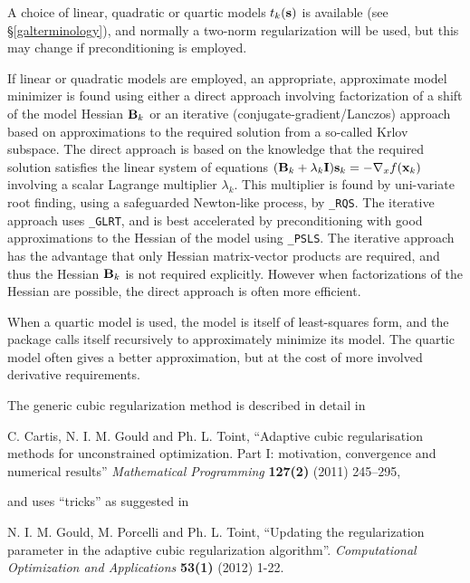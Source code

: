 \documentclass{galahad}
\begin{document}
A choice of linear, quadratic or quartic models $t_k({\mathbf{s}})$ is available
(see \S\ref{galterminology}), and normally a two-norm regularization will
be used, but this may change if preconditioning is employed.

If linear or quadratic models are employed, an appropriate,
approximate model minimizer is found using either a direct approach
involving factorization of a shift of the model Hessian ${\mathbf{B}}_k$ or an
iterative (conjugate-gradient/Lanczos) approach based on approximations
to the required solution from a so-called Krlov subspace. The direct
approach is based on the knowledge that the required solution
satisfies the linear system of equations $({\mathbf{B}}_k + \lambda_k {\mathbf{I}}) {\mathbf{s}}_k
= - \nabla_x f({\mathbf{x}}_k)$ involving a scalar Lagrange multiplier $\lambda_k$.
This multiplier is found by uni-variate root finding, using a safeguarded
Newton-like process, by {\tt \libraryname\_RQS}. The iterative approach
uses {\tt \libraryname\_GLRT}, and is best accelerated by preconditioning
with good approximations to the Hessian of the model using
{\tt \libraryname\_PSLS}. The
iterative approach has the advantage that only Hessian matrix-vector products
are required, and thus the Hessian ${\mathbf{B}}_k$ is not required explicitly.
However when factorizations of the Hessian are possible, the direct approach
is often more efficient.

When a quartic model is used, the model is itself of least-squares form,
and the package calls itself recursively to approximately minimize its
model. The quartic model often gives a better approximation, but at the
cost of more involved derivative requirements.

\vspace*{1mm}

\galreferences
\vspace*{1mm}

\noindent
The generic cubic regularization method is described in detail in
\vspace*{1mm}

\noindent
C. Cartis,  N. I. M. Gould and Ph. L. Toint,
``Adaptive cubic regularisation methods for unconstrained optimization.
Part I: motivation, convergence and numerical results''
{\em Mathematical Programming} {\bf 127(2)} (2011) 245--295,
\vspace*{1mm}

\noindent
and uses ``tricks'' as suggested in
\vspace*{1mm}

\noindent
N. I. M. Gould, M. Porcelli and Ph. L. Toint,
``Updating the regularization parameter in the adaptive cubic regularization
algorithm''.
{\em Computational Optimization and Applications}
{\bf 53(1)} (2012) 1-22.
\end{document}
